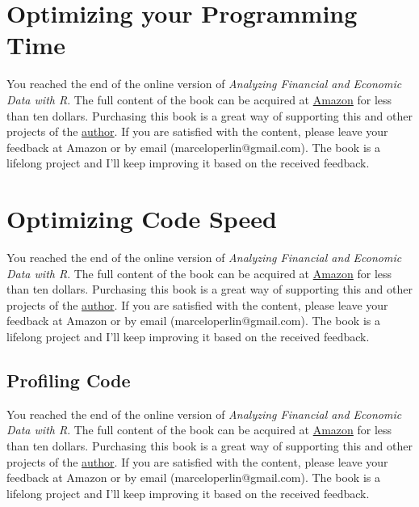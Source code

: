 \documentclass[
  12pt,
]{book}
\newenvironment{pleasebuyit}
{\begin{noteblock}
		
	} {\end{noteblock}}
\begin{document}
\hypertarget{optimizing-your-programming-time}{%
\section{Optimizing your Programming Time}\label{optimizing-your-programming-time}}

\begin{pleasebuyit}
You reached the end of the online version of \emph{Analyzing Financial
and Economic Data with R}. The full content of the book can be acquired
at \href{https://www.amazon.com/dp/B084LSNXMN}{Amazon} for less than ten
dollars. Purchasing this book is a great way of supporting this and
other projects of the \href{https://www.msperlin.com/}{author}. If you
are satisfied with the content, please leave your feedback at Amazon or
by email (marceloperlin@gmail.com). The book is a lifelong project and
I'll keep improving it based on the received feedback.
\end{pleasebuyit}

\hypertarget{optimizing-code-speed}{%
\section{Optimizing Code Speed}\label{optimizing-code-speed}}

\begin{pleasebuyit}
You reached the end of the online version of \emph{Analyzing Financial
and Economic Data with R}. The full content of the book can be acquired
at \href{https://www.amazon.com/dp/B084LSNXMN}{Amazon} for less than ten
dollars. Purchasing this book is a great way of supporting this and
other projects of the \href{https://www.msperlin.com/}{author}. If you
are satisfied with the content, please leave your feedback at Amazon or
by email (marceloperlin@gmail.com). The book is a lifelong project and
I'll keep improving it based on the received feedback.
\end{pleasebuyit}

\hypertarget{profiling-code}{%
\subsection{Profiling Code}\label{profiling-code}}

\begin{pleasebuyit}
You reached the end of the online version of \emph{Analyzing Financial
and Economic Data with R}. The full content of the book can be acquired
at \href{https://www.amazon.com/dp/B084LSNXMN}{Amazon} for less than ten
dollars. Purchasing this book is a great way of supporting this and
other projects of the \href{https://www.msperlin.com/}{author}. If you
are satisfied with the content, please leave your feedback at Amazon or
by email (marceloperlin@gmail.com). The book is a lifelong project and
I'll keep improving it based on the received feedback.
\end{pleasebuyit}
\end{document}
